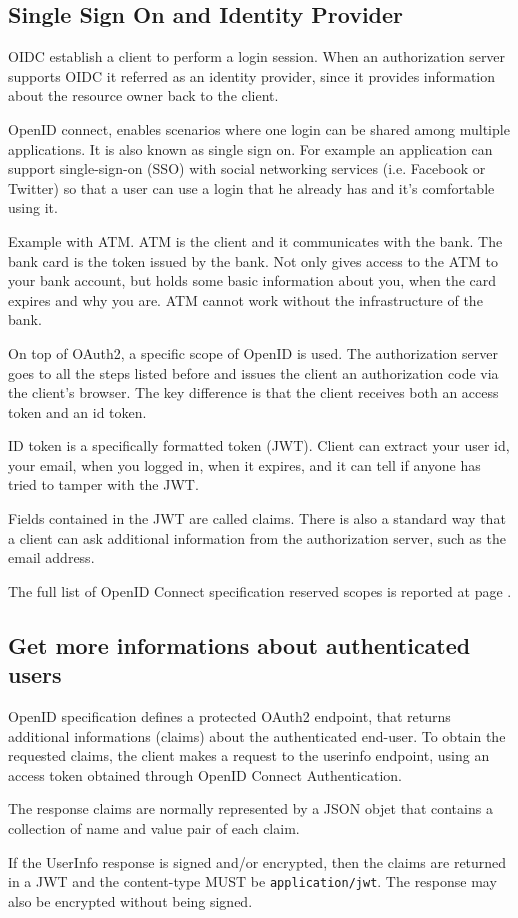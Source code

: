 \subsection{Single Sign On and Identity Provider}
OIDC establish a client to perform a login session.
When an authorization server supports OIDC it referred as an identity provider,
since it provides information about the resource owner back to the client.

OpenID connect, enables scenarios where one login can be shared among multiple
applications. It is also known as single sign on.
For example an application can support single-sign-on (SSO) with social networking services (i.e.
Facebook or Twitter) so that a user can use a login that he already has and it's
comfortable using it.

Example with ATM. ATM is the client and it communicates with the bank. The bank
card is the token issued by the bank. Not only gives access to the ATM to your
bank account, but holds some basic information about you, when the card expires
and why you are.
ATM cannot work without the infrastructure of the bank.

On top of OAuth2, a specific scope of OpenID is used. The authorization server
goes to all the steps listed before and issues the client an authorization code
via the client's browser.
The key difference is that the client receives both an access token and an id
token.

ID token is a specifically formatted token (JWT). Client can extract your user
id, your email, when you logged in, when it expires, and it can tell if anyone
has tried to tamper with the JWT.

Fields contained in the JWT are called claims.
There is also a standard way that a client can ask additional information from the
authorization server, such as the email address.

The full list of OpenID Connect specification reserved scopes is reported at
page \pageref{openid}.

\subsection{Get more informations about authenticated users}
OpenID specification defines a protected OAuth2 endpoint, that returns
additional informations (claims) about the authenticated end-user.
To obtain the requested claims, the client makes a request to the userinfo
endpoint, using an access token obtained through OpenID Connect
Authentication.

The response claims are normally represented by a JSON objet that contains a
collection of name and value pair of each claim.

If the UserInfo response is signed and/or encrypted, then the claims are
returned in a JWT and the content-type MUST be \texttt{application/jwt}.
The response may also be encrypted without being signed.


